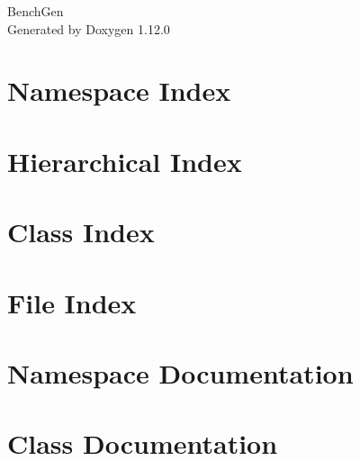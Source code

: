 \documentclass[twoside]{book}
\newcommand{\+}{\discretionary{\mbox{\scriptsize$\hookleftarrow$}}{}{}}
\newcommand{\clearemptydoublepage}{%
    \newpage{\pagestyle{empty}\cleardoublepage}%
  }
\begin{document}
  \raggedbottom
    \hypersetup{pageanchor=false,
                bookmarksnumbered=true,
                pdfencoding=unicode
               }
  \begin{titlepage}
  \vspace*{7cm}
  \begin{center}%
  {\Large Bench\+Gen}\\
  \vspace*{1cm}
  {\large Generated by Doxygen 1.12.0}\\
  \end{center}
  \end{titlepage}
  \clearemptydoublepage
  \tableofcontents
  \clearemptydoublepage
  \hypersetup{pageanchor=true}

\chapter{Namespace Index}

\chapter{Hierarchical Index}

\chapter{Class Index}

\chapter{File Index}

\chapter{Namespace Documentation}

\chapter{Class Documentation}





























\end{document}
